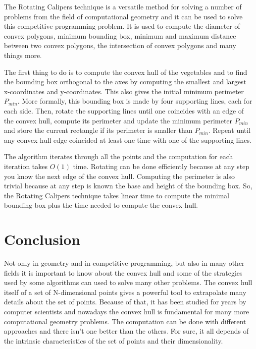 \documentclass{article}
\begin{document}
The Rotating Calipers technique is a versatile method for solving a number of problems from the field of computational geometry and it can be used to solve this competitive programming problem. It is used to compute the diameter of convex polygons, minimum bounding box, minimum and maximum distance between two convex polygons, the intersection of convex polygons and many things more.

The first thing to do is to compute the convex hull of the vegetables and to find the bounding box orthogonal to the axes by computing the smallest and largest x-coordinates and y-coordinates. This also gives the initial minimum perimeter $P_{min}$. More formally, this bounding box is made by four supporting lines, each for each side. Then, rotate the supporting lines until one coincides with an edge of the convex hull, compute its perimeter and update the minimum perimeter $P_{min}$ and store the current rectangle if its perimeter is smaller than $P_{min}$. Repeat until any convex hull edge coincided at least one time with one of the supporting lines. 

The algorithm iterates through all the points and the computation for each iteration takes $O(1)$ time. Rotating can be done efficiently because at any step you know the next edge of the convex hull. Computing the perimeter is also trivial because at any step is known the base and height of the bounding box. So, the Rotating Calipers technique takes linear time to compute the minimal bounding box plus the time needed to compute the convex hull. 

\newpage
\section{Conclusion}

Not only in geometry and in competitive programming, but also in many other fields it is important to know about the convex hull and some of the strategies used by some algorithms can used to solve many other problems. The convex hull itself of a set of N-dimensional points gives a powerful tool to extrapolate many details about the set of points. Because of that, it has been studied for years by computer scientists and nowadays the convex hull is fundamental for many more computational geometry problems. The computation can be done with different approaches and there isn't one better than the others. For sure, it all depends of the intrinsic characteristics of the set of  points and their dimensionality.
\end{document}
